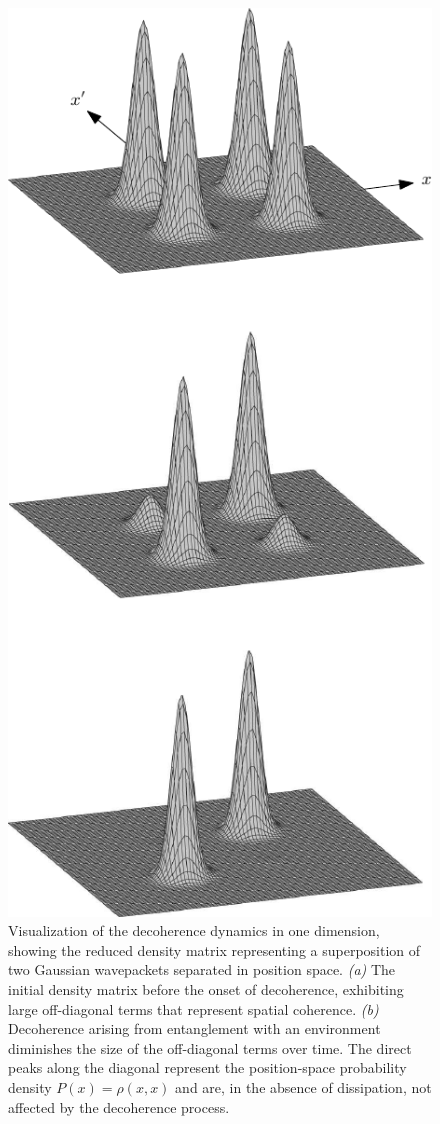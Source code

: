 \documentclass[3p,sort&compress]{elsarticle}
\begin{document}
\begin{figure}
\includegraphics[scale=.77]{r2.pdf}
\caption{\label{fig:r12}Visualization of the decoherence dynamics in one dimension, showing the reduced density matrix representing a superposition of two Gaussian wavepackets separated in position space. \emph{(a)} The initial density matrix before the onset of decoherence, exhibiting large off-diagonal terms that represent spatial coherence. \emph{(b)} Decoherence arising from entanglement with an environment diminishes the size of the off-diagonal terms over time. The direct peaks along the diagonal represent the position-space probability density $P(x)=\rho(x,x)$ and are, in the absence of dissipation, not affected by the decoherence process.}
\end{figure}
\end{document}
